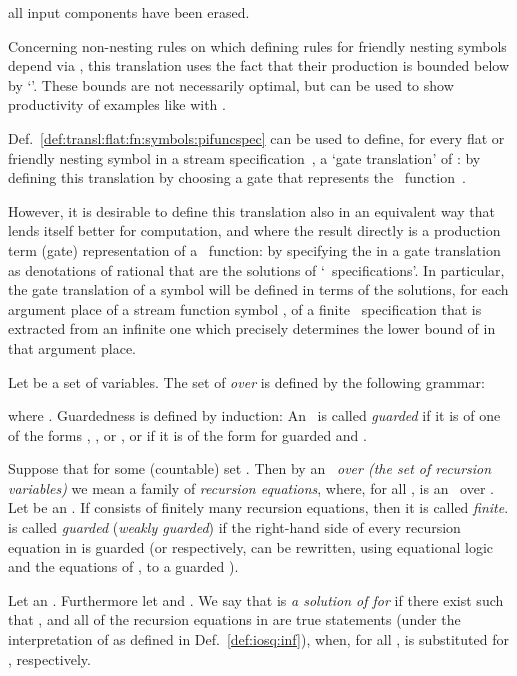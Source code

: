 all input components have been erased.

Concerning non-nesting rules on which defining rules for
friendly nesting symbols depend via ,
this translation uses the fact that
their production is bounded below by `'.
These bounds are not necessarily optimal,
but can be used to show productivity of examples like
 with
.

Def.~\ref{def:transl:flat:fn:symbols:pifuncspec} can be used to define, 
for every flat or friendly nesting symbol  
in a stream specification~, a `gate translation' of :
by defining this translation by choosing
a gate that represents the \pein~function~. 

However, it is desirable to define this translation also in an
equivalent way that lends itself better for computation,
and where the result directly is a production term (gate) representation 
of a \pein~function:
by specifying the  in a gate translation
as denotations of rational  that are
the solutions of `\ioseq\ specifications'. 
In particular, the gate translation of a symbol 
will be defined in terms of the solutions, 
for each argument place of a stream function symbol , 
of a finite \ioseq\ specification
that is extracted from an infinite one which precisely
determines the \daob{} lower bound of  in that argument place.






\begin{definition}\normalfont\label{def:infioseqspecs}
  Let  be a set of variables.
  The set of \emph{ over }
  is defined by the following grammar:
  
where .
  Guardedness is defined by induction:
  An \infioseqspecexp\ is called \emph{guarded}
  if it is of one of the forms 
  , ,
  or , or if it is of the form
   for guarded 
  and .

  Suppose that 
  for some (countable) set .
  Then by an \emph{\infioseqspec\ over (the set of recursion variables) }
  we mean
  a family 
  of \emph{recursion equations}, where, for all ,
   is an \infioseqspecexp\ over .
  Let  be an \infioseqspec.
  If   consists of finitely many recursion equations,
  then it is called \emph{finite}.
   is called \emph{guarded} (\emph{weakly guarded})
  if the right-hand side of every recursion equation in 
  is guarded (or respectively, can be rewritten, using equational logic
  and the equations of , to a guarded \infioseqspecexp).

  Let 
  an \infioseqspec. Furthermore let  and .
  We say that  is \emph{a solution of  for }
  if there exist   
  such that ,
  and all of the recursion equations in  
  are true statements 
  (under the interpretation of  as defined in
   Def.~\ref{def:iosq:inf}),
  when, for all ,
   is substituted for , respectively.
\end{definition}


